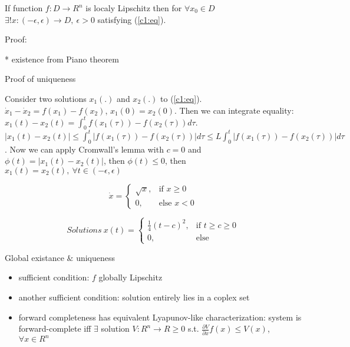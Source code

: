 If function $f:D \rightarrow R^n$ is localy Lipschitz then for $\forall x_0 \in D$
\ $\exists ! x:(-\epsilon, \epsilon) \rightarrow D, \ \epsilon > 0$
satisfying (\ref{c1:eq}).

Proof:

* existence from Piano theorem

Proof of uniqueness

Consider two solutions $x_1(.)$ and $x_2(.)$ to (\ref{c1:eq}). $\dot x_1-\dot x_2=f(x_1)-f(x_2)$,
$x_1(0)=x_2(0)$. Then we can integrate equality: 
$x_1(t)-x_2(t)=\int^t_0 f(x_1(\tau))-f(x_2(\tau)) d\tau$.  
$|x_1(t)-x_2(t)| \le \int^t_0 |f(x_1(\tau))-f(x_2(\tau))| d\tau \le 
L \int^t_0 |f(x_1(\tau))-f(x_2(\tau))| d\tau$. Now we can apply Cromwall's lemma with $c=0$
and $\phi(t)=|x_1(t)-x_2(t)|$, then $\phi(t)\le 0$, then $x_1(t)=x_2(t), \ \forall t 
\in (-\epsilon,\epsilon)$

\begin{equation*}
    \dot x = 
    \begin{cases}
      \sqrt{x}, & \mbox{if } x \ge 0 \\
      0, & \mbox{else } x<0 
    \end{cases}
\end{equation*}

\begin{equation*}
    Solutions\ x(t) =
    \begin{cases}
      \frac{1}{4}(t-c)^2, & \mbox{if } t \ge c \ge 0 \\
      0, &\mbox {else} 
    \end{cases}
\end{equation*}

Global existance $\&$ uniqueness
\begin{itemize}
 \item sufficient condition: $f$ globally Lipschitz
 \item another sufficient condition: solution entirely lies in a coplex set
 \item forward completeness has equivalent Lyapunov-like characterization: system is
      forward-complete iff $\exists$ solution $V:R^n \rightarrow R \ge 0$ s.t.
      $\frac{\partial V}{\partial x} f(x) \le V(x)$, $\forall x \in R^n$
\end{itemize}


